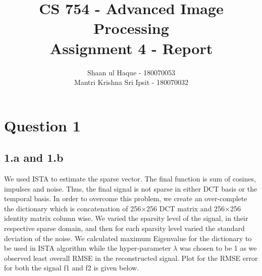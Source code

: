\documentclass[12pt]{article}
\title{CS 754 - Advanced Image Processing\\Assignment 4 - Report}
\author{Shaan ul Haque - 180070053\\Mantri Krishna Sri Ipsit - 180070032}
\begin{document}
\maketitle

\section*{Question 1}
\subsection*{1.a and 1.b}
We used ISTA to estimate the sparse vector. The final function is sum of cosines, impulses and noise. Thus, the final signal is not sparse in either DCT basis or the temporal basis. In order to overcome this problem, we create an over-complete the dictionary which is concatenation of 256×256 DCT matrix and 256×256 identity matrix column wise. We varied the sparsity level of the signal, in their respective sparse domain, and then for each sparsity level varied the standard deviation of the noise. We calculated maximum Eigenvalue for the dictionary to be used in ISTA algorithm while the hyper-parameter $\lambda$ was chosen to be 1 as we observed least overall RMSE in the reconstructed signal. Plot for the RMSE error for both the signal f1 and f2 is given below.  
\end{document}
